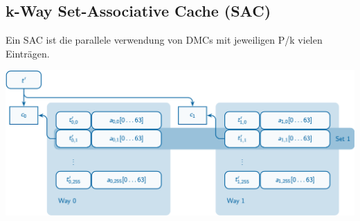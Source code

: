 \documentclass[8pt,landscape,a4paper]{scrartcl}
\begin{document}
\begin{multicols*}{5}
\subsection{k-Way Set-Associative Cache (SAC)}
Ein SAC ist die parallele verwendung von DMCs mit jeweiligen P/k vielen Einträgen. 
\begin{center}
	\vspace{-7pt}
	\includegraphics[scale=.2]{Graphic/SAC}
\end{center}	



\columnbreak




\end{multicols*}
\end{document}
